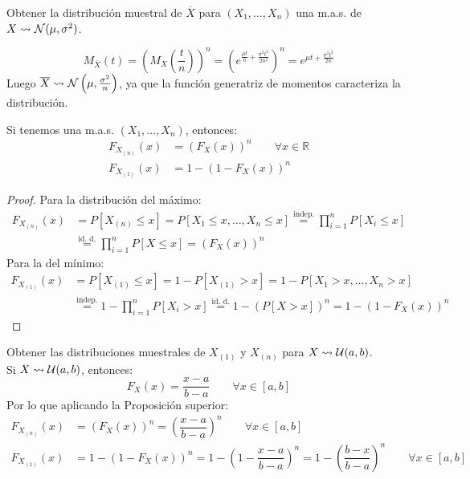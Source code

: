 \begin{ejemplo}\label{ej:dist_muestral_media}
    Obtener la distribución muestral de $\overline{X}$ para $(X_1, \ldots, X_n)$ una m.a.s. de $X\rightsquigarrow \mathcal{N}(\mu, \sigma^2)$.

    \begin{equation*}
        M_{\overline{X}}(t) = {\left(M_X\left(\frac{t}{n}\right)\right)}^{n} = {\left(e^{\frac{\mu t}{n} + \frac{\sigma^2 t^2}{2n^2}}\right)}^{n} = e^{\mu t + \frac{\sigma^2 t^2}{2n}}
    \end{equation*}
    Luego $\overline{X}\rightsquigarrow \mathcal{N}\left(\mu, \frac{\sigma^2}{n}\right)$, ya que la función generatriz de momentos caracteriza la distribución.
\end{ejemplo}

\begin{prop}
    Si tenemos una m.a.s. $(X_1, \ldots, X_n)$, entonces:
    \begin{align*}
        F_{X_{(n)}}(x) &= {(F_X(x))}^{n} \qquad \forall x\in \mathbb{R} \\
        F_{X_{(1)}}(x) &= 1-{(1-F_X(x))}^{n}
    \end{align*}
    \begin{proof}
        Para la distribución del máximo:
        \begin{align*}
            F_{X_{(n)}}(x) &= P[X_{(n)} \leq x] = P[X_1 \leq x, \ldots, X_n \leq x] \stackrel{\text{indep.}}{=} \prod_{i=1}^{n} P[X_i \leq x] \\ &\stackrel{\text{id. d.}}{=} \prod_{i=1}^{n} P[X\leq x] = {(F_X(x))}^{n}
        \end{align*}
        Para la del mínimo:
        \begin{align*}
            F_{X_{(1)}}(x) &= P[X_{(1)}\leq x] = 1-P[X_{(1)} > x] = 1-P[X_1 > x, \ldots, X_n > x] \\ &\stackrel{\text{indep.}}{=} 1 - \prod_{i=1}^{n}P[X_i > x] \stackrel{\text{id. d.}}{=} 1-{(P[X>x])}^{n} = 1-{(1-F_X(x))}^{n}
        \end{align*}
    \end{proof}
\end{prop}

\begin{ejemplo}
    Obtener las distribuciones muestrales de $X_{(1)}$ y  $X_{(n)}$ para \newline $X\rightsquigarrow \mathcal{U}(a,b)$.\\

    \noindent
    Si $X\rightsquigarrow \mathcal{U}(a,b)$, entonces:
    \begin{equation*}
        F_X(x) = \dfrac{x-a}{b-a} \qquad \forall x\in [a,b]
    \end{equation*}
    Por lo que aplicando la Proposición superior:
    \begin{align*}
        F_{X_{(n)}}(x) &= {(F_X(x))}^{n} = {\left(\dfrac{x-a}{b-a}\right)}^{n} \qquad \forall x\in [a,b] \\
        F_{X_{(1)}}(x) &= 1 - {(1-F_X(x))}^{n} = 1-{\left(1-\dfrac{x-a}{b-a}\right)}^{n} 
        = 1-{\left(\dfrac{b-x}{b-a}\right)}^{n} \qquad \forall x\in [a,b]
    \end{align*}
\end{ejemplo}

